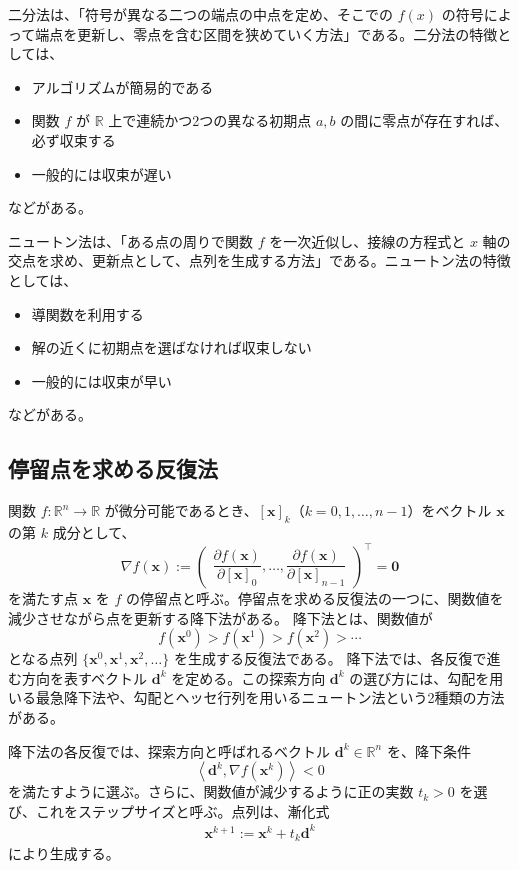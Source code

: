 \documentclass[a4j]{jarticle}
\begin{document}
二分法は、「符号が異なる二つの端点の中点を定め、そこでの $f(x)$ の符号によって端点を更新し、零点を含む区間を狭めていく方法」である。二分法の特徴としては、
\begin{itemize}
  \item アルゴリズムが簡易的である
  \item 関数 $f$ が $\mathbb{R}$ 上で連続かつ2つの異なる初期点 $a, b$ の間に零点が存在すれば、必ず収束する
  \item 一般的には収束が遅い
\end{itemize}
などがある。

ニュートン法は、「ある点の周りで関数 $f$ を一次近似し、接線の方程式と $x$ 軸の交点を求め、更新点として、点列を生成する方法」である。ニュートン法の特徴としては、
\begin{itemize}
  \item 導関数を利用する
  \item 解の近くに初期点を選ばなければ収束しない
  \item 一般的には収束が早い
\end{itemize}
などがある。

\subsection{停留点を求める反復法}
関数 $f\colon\mathbb{R}^n\to\mathbb{R}$ が微分可能であるとき、$[\bm{x}]_k$（$k=0,1,\ldots,n-1$）をベクトル $\bm{x}$ の第 $k$ 成分として、
\begin{equation}
  \nabla f(\bm{x})
  := \begin{pmatrix}
    \dfrac{\partial f(\bm{x})}{\partial [\bm{x}]_0},
    \ldots,
    \dfrac{\partial f(\bm{x})}{\partial [\bm{x}]_{n-1}}
  \end{pmatrix}^{\!\top}
  = \mathbf{0}
\end{equation}
を満たす点 $\bm{x}$ を $f$ の停留点と呼ぶ。停留点を求める反復法の一つに、関数値を減少させながら点を更新する降下法がある。
降下法とは、関数値が
\[
  f(\bm{x}^0)>f(\bm{x}^1)>f(\bm{x}^2)>\cdots
\]
となる点列 $\{\bm{x}^0,\bm{x}^1,\bm{x}^2,\ldots\}$ を生成する反復法である。
降下法では、各反復で進む方向を表すベクトル $\bm{d}^k$ を定める。この探索方向 $\bm{d}^k$ の選び方には、勾配を用いる最急降下法や、勾配とヘッセ行列を用いるニュートン法という2種類の方法がある。

降下法の各反復では、探索方向と呼ばれるベクトル $\bm{d}^k\in\mathbb{R}^n$ を、降下条件
\[
  \left\langle \bm{d}^k,\nabla f(\bm{x}^k)\right\rangle<0
\]
を満たすように選ぶ。さらに、関数値が減少するように正の実数 $t_k>0$ を選び、これをステップサイズと呼ぶ。点列は、漸化式
\begin{align}
  \bm{x}^{k+1}:=\bm{x}^k+t_k\bm{d}^k
  \label{eq:update}
\end{align}
により生成する。
\end{document}
